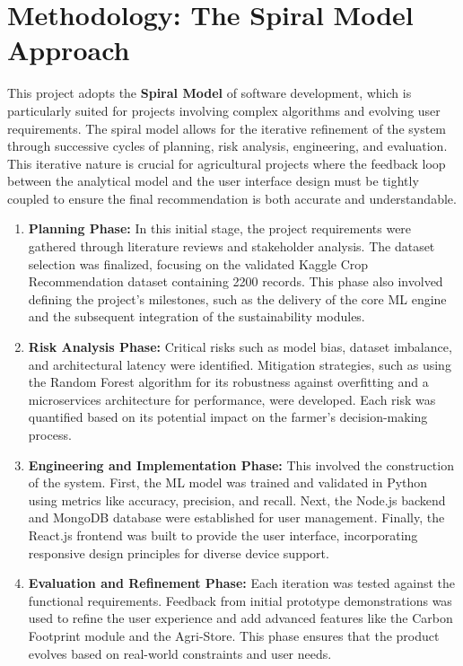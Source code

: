 \documentclass[12pt,a4paper]{report}
\begin{document}
\section{Methodology: The Spiral Model Approach}
This project adopts the \textbf{Spiral Model} of software development, which is particularly suited for projects involving complex algorithms and evolving user requirements. The spiral model allows for the iterative refinement of the system through successive cycles of planning, risk analysis, engineering, and evaluation. This iterative nature is crucial for agricultural projects where the feedback loop between the analytical model and the user interface design must be tightly coupled to ensure the final recommendation is both accurate and understandable.

\begin{enumerate}
    \item \textbf{Planning Phase:} In this initial stage, the project requirements were gathered through literature reviews and stakeholder analysis. The dataset selection was finalized, focusing on the validated Kaggle Crop Recommendation dataset containing 2200 records. This phase also involved defining the project's milestones, such as the delivery of the core ML engine and the subsequent integration of the sustainability modules.
    \item \textbf{Risk Analysis Phase:} Critical risks such as model bias, dataset imbalance, and architectural latency were identified. Mitigation strategies, such as using the Random Forest algorithm for its robustness against overfitting and a microservices architecture for performance, were developed. Each risk was quantified based on its potential impact on the farmer's decision-making process.
    \item \textbf{Engineering and Implementation Phase:} This involved the construction of the system. First, the ML model was trained and validated in Python using metrics like accuracy, precision, and recall. Next, the Node.js backend and MongoDB database were established for user management. Finally, the React.js frontend was built to provide the user interface, incorporating responsive design principles for diverse device support.
    \item \textbf{Evaluation and Refinement Phase:} Each iteration was tested against the functional requirements. Feedback from initial prototype demonstrations was used to refine the user experience and add advanced features like the Carbon Footprint module and the Agri-Store. This phase ensures that the product evolves based on real-world constraints and user needs.
\end{enumerate}
\end{document}
